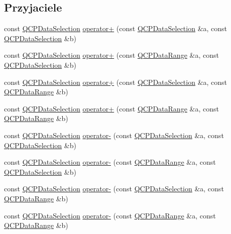 \subsection*{Przyjaciele}
\begin{DoxyCompactItemize}
\item 
const \hyperlink{class_q_c_p_data_selection}{Q\+C\+P\+Data\+Selection} \hyperlink{class_q_c_p_data_selection_a49c0217af248959d59abfdd29401b678}{operator+} (const \hyperlink{class_q_c_p_data_selection}{Q\+C\+P\+Data\+Selection} \&a, const \hyperlink{class_q_c_p_data_selection}{Q\+C\+P\+Data\+Selection} \&b)
\item 
const \hyperlink{class_q_c_p_data_selection}{Q\+C\+P\+Data\+Selection} \hyperlink{class_q_c_p_data_selection_a5feed9419bd3df5cb4d4a761580545cc}{operator+} (const \hyperlink{class_q_c_p_data_range}{Q\+C\+P\+Data\+Range} \&a, const \hyperlink{class_q_c_p_data_selection}{Q\+C\+P\+Data\+Selection} \&b)
\item 
const \hyperlink{class_q_c_p_data_selection}{Q\+C\+P\+Data\+Selection} \hyperlink{class_q_c_p_data_selection_aa574f51a74d6998e9be95e252e6be287}{operator+} (const \hyperlink{class_q_c_p_data_selection}{Q\+C\+P\+Data\+Selection} \&a, const \hyperlink{class_q_c_p_data_range}{Q\+C\+P\+Data\+Range} \&b)
\item 
const \hyperlink{class_q_c_p_data_selection}{Q\+C\+P\+Data\+Selection} \hyperlink{class_q_c_p_data_selection_a0822e3133b80b5dedfc8050a19c1e0c5}{operator+} (const \hyperlink{class_q_c_p_data_range}{Q\+C\+P\+Data\+Range} \&a, const \hyperlink{class_q_c_p_data_range}{Q\+C\+P\+Data\+Range} \&b)
\item 
const \hyperlink{class_q_c_p_data_selection}{Q\+C\+P\+Data\+Selection} \hyperlink{class_q_c_p_data_selection_a41147ef7d6303c746e398278b7b624d1}{operator-\/} (const \hyperlink{class_q_c_p_data_selection}{Q\+C\+P\+Data\+Selection} \&a, const \hyperlink{class_q_c_p_data_selection}{Q\+C\+P\+Data\+Selection} \&b)
\item 
const \hyperlink{class_q_c_p_data_selection}{Q\+C\+P\+Data\+Selection} \hyperlink{class_q_c_p_data_selection_a726652cb9ed840e3025435cc2c266468}{operator-\/} (const \hyperlink{class_q_c_p_data_range}{Q\+C\+P\+Data\+Range} \&a, const \hyperlink{class_q_c_p_data_selection}{Q\+C\+P\+Data\+Selection} \&b)
\item 
const \hyperlink{class_q_c_p_data_selection}{Q\+C\+P\+Data\+Selection} \hyperlink{class_q_c_p_data_selection_a32c5784ac70946f09a09b2dd19816b78}{operator-\/} (const \hyperlink{class_q_c_p_data_selection}{Q\+C\+P\+Data\+Selection} \&a, const \hyperlink{class_q_c_p_data_range}{Q\+C\+P\+Data\+Range} \&b)
\item 
const \hyperlink{class_q_c_p_data_selection}{Q\+C\+P\+Data\+Selection} \hyperlink{class_q_c_p_data_selection_ad62dd67b505c1fa9c02d1aafabcb9acf}{operator-\/} (const \hyperlink{class_q_c_p_data_range}{Q\+C\+P\+Data\+Range} \&a, const \hyperlink{class_q_c_p_data_range}{Q\+C\+P\+Data\+Range} \&b)
\end{DoxyCompactItemize}
